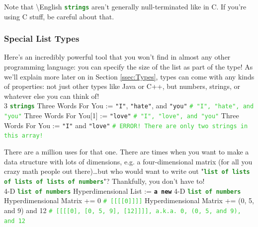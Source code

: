 \documentclass{article}
\newcommand{\English}{\textbackslash{}English}				%
\newcommand{\sssecl}[1]{\subsubsection{#1}\label{sssec:#1}}
\newcommand{\codecomment}[1]{\texttt{\textcolor{LimeGreen}{#1}}}
\newcommand{\commentline}[1]{\codecomment{\# #1}}
\newcommand{\type}[1]{\texttt{\textcolor{ForestGreen}{\textbf{#1}}}}
\newcommand{\common}[1]{\texttt{\textcolor{Mulberry}{\textbf{#1}}}}
\newcommand{\codestring}[1]{\texttt{\textcolor{NavyBlue}{"#1"}}}
\newenvironment{code}[0]
{\ttfamily{}				%
\setlength\parindent{0cm}	%
~\\}
{\setlength\parindent{1cm}
~\\}
\begin{document}
\indent Note that \English{} \type{strings} aren't generally null-terminated like in C. If you're using C stuff, be careful about that.

\sssecl{Special List Types}
\indent Here's an incredibly powerful tool that you won't find in almost any other programming language: you can specify the size of the list as part of the type! As we'll explain more later on in Section \ref{ssec:Types}, types can come with any kinds of properties: not just other types like Java or C++, but numbers, strings, or whatever else you can think of!
\begin{code}
3 \type{strings} Three Words For You := \codestring{I}, \codestring{hate}, and \codestring{you}	\commentline{"I", "hate", and "you"}
Three Words For You[1] := \codestring{love}	\commentline{"I", "love", and "you"}
Three Words For You := \codestring{I} and \codestring{love}	\commentline{ERROR! There are only two strings in this array!}
\end{code}

\indent There are a million uses for that one.
\indent There are times when you want to make a data structure with lots of dimensions, e.g. a four-dimensional matrix (for all you crazy math people out there)\ldots{}but who would want to write out "\type{list of lists of lists of lists of numbers}"? Thankfully, you don't have to!
\begin{code}
4-D \type{list of numbers} Hyperdimensional List := \common{a new} 4-D \type{list of numbers}
Hyperdimensional Matrix += 0	\commentline{[[[[0]]]]}
Hyperdimensional Matrix += (0, 5, and 9) and 12	\commentline{[[[[0], [0, 5, 9], [12]]]], a.k.a. 0, (0, 5, and 9), and 12}
\end{code}
\end{document}
